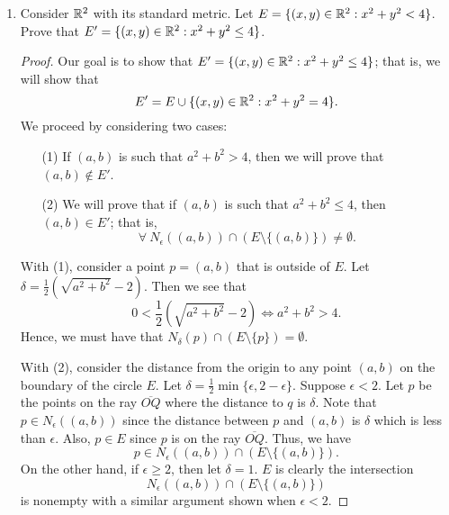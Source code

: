 \documentclass[a4paper]{article}
\begin{document}
\begin{enumerate}
\begin{enumerate}
\begin{solution}
                \end{solution}
        \end{enumerate}
    \item Consider \( \mathbb{R}^{2}  \) with its standard metric. Let \( E = \{ (x,y) \in \mathbb{R}^{2} : x^{2} + y^{2} < 4  \}  \). Prove that \( E' = \{ (x,y) \in \mathbb{R}^{2} : x^{2} + y^{2} \leq 4  \}  \).
        \begin{proof}
            Our goal is to show that \( E' = \{ (x,y) \in \mathbb{R}^{2} : x^{2} + y^{2} \leq 4  \}  \); that is, we will show that 
            \[  E' = E \cup \{ (x,y) \in \mathbb{R}^{2} : x^{2} + y^{2} = 4  \}.  \]
            We proceed by considering two cases:
            \begin{enumerate}
                \item[(1)] If \( (a,b)  \) is such that \( a^{2} + b^{2} > 4  \), then we will prove that \( (a,b) \notin E' \).
                \item[(2)] We will prove that if \( (a,b) \) is such that \( a^{2} + b^{2} \leq 4  \), then \( (a,b) \in E' \); that is,   
                    \[  \forall \ {N}_{\epsilon}((a,b)) \cap (E \setminus  \{ (a,b) \} ) \neq \emptyset. \] 
            \end{enumerate}
            With (1), consider a point \( p = (a,b) \) that is outside of \( E  \). Let \( \delta = \frac{ 1 }{ 2 }  (\sqrt{ a^{2} + b^{2} } - 2 ) \). Then we see that    
            \[  0 < \frac{ 1 }{ 2 } (\sqrt{ a^{2} + b^{2} }  - 2 ) \Longleftrightarrow a^{2} + b^{2} > 4.    \]
            Hence, we must have that \( {N}_{\delta}(p) \cap (E \setminus \{ p \} ) = \emptyset. \)

            With (2), consider the distance from the origin to any point \( (a,b) \) on the boundary of the circle \( E  \). Let \( \delta = \frac{ 1 }{ 2 } \min \{ \epsilon, 2 - \epsilon \}   \). Suppose \( \epsilon < 2  \). Let \( p \) be the points on the ray \( \overline{OQ} \) where the distance to \( q  \) is \( \delta \). Note that \( p \in {N}_{\epsilon}((a,b))   \) since the distance between \( p  \) and \( (a,b) \) is \( \delta \) which is less than \( \epsilon  \). Also, \( p \in E  \) since \( p  \) is on the ray \( \overline{OQ} \). Thus, we have 
            \[  p \in {N}_{\epsilon}((a,b)) \cap (E \setminus  \{ (a,b) \} ). \]
            On the other hand, if \( \epsilon \geq 2  \), then let \( \delta = 1  \). \( E  \) is clearly the intersection   
            \[  {N}_{\epsilon}((a,b)) \cap (E \setminus  \{ (a,b) \} ) \]
            is nonempty with a similar argument shown when \( \epsilon  < 2  \).


\end{proof}
\end{enumerate}
\end{document}

